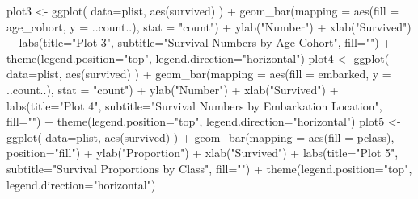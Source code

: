\documentclass[
]{article}
\newenvironment{Shaded}{\begin{snugshade}}{\end{snugshade}}
\newcommand{\AttributeTok}[1]{\textcolor[rgb]{0.77,0.63,0.00}{#1}}
\newcommand{\FunctionTok}[1]{\textcolor[rgb]{0.00,0.00,0.00}{#1}}
\newcommand{\NormalTok}[1]{#1}
\newcommand{\OtherTok}[1]{\textcolor[rgb]{0.56,0.35,0.01}{#1}}
\newcommand{\SpecialCharTok}[1]{\textcolor[rgb]{0.00,0.00,0.00}{#1}}
\newcommand{\StringTok}[1]{\textcolor[rgb]{0.31,0.60,0.02}{#1}}
\begin{document}
\begin{Shaded}
\begin{Highlighting}[]
\NormalTok{plot3 }\OtherTok{\textless{}{-}} \FunctionTok{ggplot}\NormalTok{( }\AttributeTok{data=}\NormalTok{plist, }\FunctionTok{aes}\NormalTok{(survived) ) }\SpecialCharTok{+} \FunctionTok{geom\_bar}\NormalTok{(}\AttributeTok{mapping =} \FunctionTok{aes}\NormalTok{(}\AttributeTok{fill =}\NormalTok{ age\_cohort, }\AttributeTok{y =}\NormalTok{ ..count..), }\AttributeTok{stat =} \StringTok{"count"}\NormalTok{) }\SpecialCharTok{+} \FunctionTok{ylab}\NormalTok{(}\StringTok{"Number"}\NormalTok{) }\SpecialCharTok{+} \FunctionTok{xlab}\NormalTok{(}\StringTok{"Survived"}\NormalTok{) }\SpecialCharTok{+} \FunctionTok{labs}\NormalTok{(}\AttributeTok{title=}\StringTok{"Plot 3"}\NormalTok{, }\AttributeTok{subtitle=}\StringTok{"Survival Numbers by Age Cohort"}\NormalTok{, }\AttributeTok{fill=}\StringTok{""}\NormalTok{) }\SpecialCharTok{+} \FunctionTok{theme}\NormalTok{(}\AttributeTok{legend.position=}\StringTok{"top"}\NormalTok{, }\AttributeTok{legend.direction=}\StringTok{"horizontal"}\NormalTok{)}
\NormalTok{plot4 }\OtherTok{\textless{}{-}} \FunctionTok{ggplot}\NormalTok{( }\AttributeTok{data=}\NormalTok{plist, }\FunctionTok{aes}\NormalTok{(survived) ) }\SpecialCharTok{+} \FunctionTok{geom\_bar}\NormalTok{(}\AttributeTok{mapping =} \FunctionTok{aes}\NormalTok{(}\AttributeTok{fill =}\NormalTok{ embarked, }\AttributeTok{y =}\NormalTok{ ..count..), }\AttributeTok{stat =} \StringTok{"count"}\NormalTok{) }\SpecialCharTok{+} \FunctionTok{ylab}\NormalTok{(}\StringTok{"Number"}\NormalTok{) }\SpecialCharTok{+} \FunctionTok{xlab}\NormalTok{(}\StringTok{"Survived"}\NormalTok{) }\SpecialCharTok{+} \FunctionTok{labs}\NormalTok{(}\AttributeTok{title=}\StringTok{"Plot 4"}\NormalTok{, }\AttributeTok{subtitle=}\StringTok{"Survival Numbers by Embarkation Location"}\NormalTok{, }\AttributeTok{fill=}\StringTok{""}\NormalTok{) }\SpecialCharTok{+} \FunctionTok{theme}\NormalTok{(}\AttributeTok{legend.position=}\StringTok{"top"}\NormalTok{, }\AttributeTok{legend.direction=}\StringTok{"horizontal"}\NormalTok{)}
\NormalTok{plot5 }\OtherTok{\textless{}{-}} \FunctionTok{ggplot}\NormalTok{( }\AttributeTok{data=}\NormalTok{plist, }\FunctionTok{aes}\NormalTok{(survived) ) }\SpecialCharTok{+} \FunctionTok{geom\_bar}\NormalTok{(}\AttributeTok{mapping =} \FunctionTok{aes}\NormalTok{(}\AttributeTok{fill =}\NormalTok{ pclass), }\AttributeTok{position=}\StringTok{"fill"}\NormalTok{) }\SpecialCharTok{+} \FunctionTok{ylab}\NormalTok{(}\StringTok{"Proportion"}\NormalTok{) }\SpecialCharTok{+} \FunctionTok{xlab}\NormalTok{(}\StringTok{"Survived"}\NormalTok{) }\SpecialCharTok{+} \FunctionTok{labs}\NormalTok{(}\AttributeTok{title=}\StringTok{"Plot 5"}\NormalTok{, }\AttributeTok{subtitle=}\StringTok{"Survival Proportions by Class"}\NormalTok{, }\AttributeTok{fill=}\StringTok{""}\NormalTok{) }\SpecialCharTok{+} \FunctionTok{theme}\NormalTok{(}\AttributeTok{legend.position=}\StringTok{"top"}\NormalTok{, }\AttributeTok{legend.direction=}\StringTok{"horizontal"}\NormalTok{)}

\end{Highlighting}
\end{Shaded}
\end{document}

